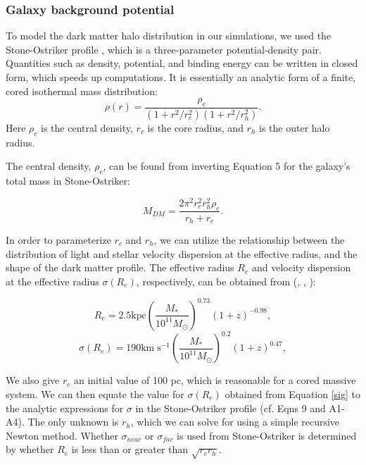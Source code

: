 \documentclass[fleqn,usenatbib,useAMS]{mnras}
\begin{document}
\subsubsection{Galaxy background potential} \label{Galaxy background potential}
To model the dark matter halo distribution in our simulations, we used the Stone-Ostriker profile \citep{2015ApJ...806L..28S}, which is a three-parameter potential-density pair.  Quantities such as density, potential, and binding energy can be written in closed form, which speeds up computations.  It is essentially an analytic form of a finite, cored isothermal mass distribution:
\begin{equation} \label{jerry}
\rho(r) = \frac{\rho_c}{(1+r^2/r_{c}^2)(1+r^2/r_{h}^2)}.
\end{equation}
Here $\rho_c$ is the central density, $r_c$ is the core radius, and $r_h$ is the outer halo radius.

The central density, $\rho_c$, can be found from inverting Equation 5 for the galaxy's total mass in Stone-Ostriker:

\begin{equation} \label{rhoc}
M_{DM} = \frac{2\pi^2r_{c}^2r_{h}^2\rho_c}{r_h+r_c}.
\end{equation}

In order to parameterize $r_c$ and $r_h$, we can utilize the relationship between the distribution of light and stellar velocity dispersion at the effective radius, and the shape of the dark matter profile.  The effective radius $R_{e}$ and velocity dispersion at the effective radius $\sigma(R_e)$, respectively, can be obtained from (\citet{2009ApJ...706L..86N}, \citet{2010ApJ...725.2312O}, \citet{2014ApJ...789..156M}):

\begin{equation} \label{re}
R_{e} = 2.5 \mathrm{kpc}\left(\frac{M_*}{10^{11}M_{\odot}}\right)^{0.73}(1+z)^{-0.98},
\end{equation}
\begin{equation} \label{sig}
\sigma(R_{e}) = 190\mathrm{km}\;\mathrm{s}^{-1}\left(\frac{M_{*}}{10^{11}M_{\odot}}\right)^{0.2}(1+z)^{0.47},
\end{equation}

We also give $r_c$ an initial value of 100 pc, which is reasonable for a cored massive system.  We can then equate the value for $\sigma({R_e})$ obtained from Equation \ref{sig} to the analytic expressions for $\sigma$ in the Stone-Ostriker profile (cf. Eqns 9 and A1-A4).  The only unknown is $r_h$, which we can solve for using a simple recursive Newton method.  Whether $\sigma_{near}$ or $\sigma_{far}$ is used from Stone-Ostriker is determined by whether $R_e$ is less than or greater than $\sqrt{r_c r_h}$.
\end{document}
